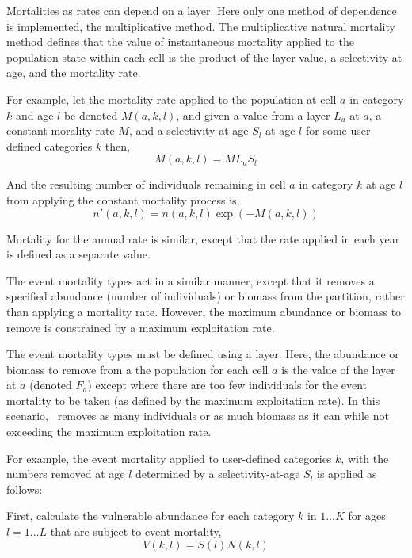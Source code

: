 Mortalities as rates can depend on a layer. Here only one method of dependence is implemented, the multiplicative method. The multiplicative natural mortality method defines that the value of instantaneous mortality applied to the population state within each cell is the product of the layer value, a selectivity-at-age, and the mortality rate. 

For example, let the mortality rate applied to the population at cell $a$ in category $k$ and age $l$ be denoted $M(a,k,l)$, and given a value from a layer $L_a$  at $a$, a constant morality rate $M$, and a selectivity-at-age $S_l$ at age $l$ for some user-defined categories $k$ then, 
\begin{equation}
  M(a,k,l) = ML_a S_l 
\end{equation}

And the resulting number of individuals remaining in cell $a$ in category $k$ at age $l$ from applying the constant mortality process is,
\begin{equation}
  n'(a,k,l) = n(a,k,l) \exp \left({-M(a,k,l)}\right)
\end{equation}

Mortality for the annual rate is similar, except that the rate applied in each year is defined as a separate value. 

The event mortality types act in a similar manner, except that it removes a specified abundance (number of individuals) or biomass from the partition, rather than applying a mortality rate. However, the maximum abundance or biomass to remove is constrained by a maximum exploitation rate.

The event mortality types must be defined using a layer. Here, the abundance or biomass to remove from a the population for each cell $a$ is the value of the layer at $a$ (denoted $F_a$) \textemdash except where there are too few individuals for the event mortality to be taken (as defined by the maximum exploitation rate). In this scenario, \SPM\ removes as many individuals or as much biomass as it can while not exceeding the maximum exploitation rate.

For example, the event mortality applied to user-defined categories $k$, with the numbers removed at age $l$ determined by a selectivity-at-age $S_l$ is applied as follows:

First, calculate the vulnerable abundance for each category $k$ in $1 \ldots K$ for ages $l = 1 \ldots L$ that are subject to event mortality,
\begin{equation}
  V(k,l) = S(l) N(k,l)
\end{equation}

